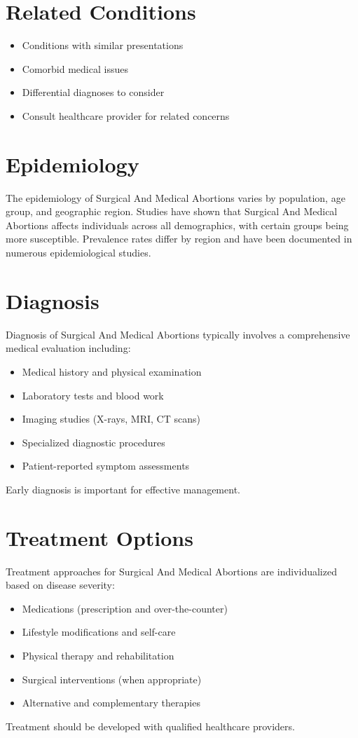 \section*{Related Conditions}
\begin{itemize}
  \item Conditions with similar presentations
  \item Comorbid medical issues
  \item Differential diagnoses to consider
  \item Consult healthcare provider for related concerns
\end{itemize}

\section*{Epidemiology}
The epidemiology of Surgical And Medical Abortions varies by population, age group, and geographic region. Studies have shown that Surgical And Medical Abortions affects individuals across all demographics, with certain groups being more susceptible. Prevalence rates differ by region and have been documented in numerous epidemiological studies.

\section*{Diagnosis}
Diagnosis of Surgical And Medical Abortions typically involves a comprehensive medical evaluation including:
\begin{itemize}
  \item Medical history and physical examination
  \item Laboratory tests and blood work
  \item Imaging studies (X-rays, MRI, CT scans)
  \item Specialized diagnostic procedures
  \item Patient-reported symptom assessments
\end{itemize}
Early diagnosis is important for effective management.

\section*{Treatment Options}
Treatment approaches for Surgical And Medical Abortions are individualized based on disease severity:
\begin{itemize}
  \item Medications (prescription and over-the-counter)
  \item Lifestyle modifications and self-care
  \item Physical therapy and rehabilitation
  \item Surgical interventions (when appropriate)
  \item Alternative and complementary therapies
\end{itemize}
Treatment should be developed with qualified healthcare providers.

